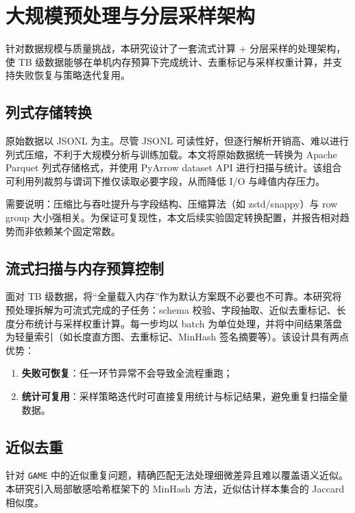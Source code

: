 \documentclass[UTF8]{article}
\begin{document}
\section{大规模预处理与分层采样架构}\label{sec:pipeline}

针对数据规模与质量挑战，本研究设计了一套流式计算 + 分层采样的处理架构，使 TB 级数据能够在单机内存预算下完成统计、去重标记与采样权重计算，并支持失败恢复与策略迭代复用。

\subsection{列式存储转换}\label{sec:parquet}

原始数据以 JSONL 为主。尽管 JSONL 可读性好，但逐行解析开销高、难以进行列式压缩，不利于大规模分析与训练加载。本文将原始数据统一转换为 Apache Parquet 列式存储格式，并使用 PyArrow dataset API 进行扫描与统计。该组合可利用列裁剪与谓词下推仅读取必要字段，从而降低 I/O 与峰值内存压力。\citep{arrow2016apache}

需要说明：压缩比与吞吐提升与字段结构、压缩算法（如 zstd/snappy）与 row group 大小强相关。为保证可复现性，本文后续实验固定转换配置，并报告相对趋势而非依赖某个固定常数。

\subsection{流式扫描与内存预算控制}\label{sec:streaming}

面对 TB 级数据，将“全量载入内存”作为默认方案既不必要也不可靠。本研究将预处理拆解为可流式完成的子任务：schema 校验、字段抽取、近似去重标记、长度分布统计与采样权重计算。每一步均以 batch 为单位处理，并将中间结果落盘为轻量索引（如长度直方图、去重标记、MinHash 签名摘要等）。该设计具有两点优势：
\begin{enumerate}
    \item \textbf{失败可恢复}：任一环节异常不会导致全流程重跑；
    \item \textbf{统计可复用}：采样策略迭代时可直接复用统计与标记结果，避免重复扫描全量数据。
\end{enumerate}

\subsection{近似去重}\label{sec:minhash}

针对 \texttt{GAME} 中的近似重复问题，精确匹配无法处理细微差异且难以覆盖语义近似。本研究引入局部敏感哈希框架下的 MinHash 方法，近似估计样本集合的 Jaccard 相似度。\citep{broder1997resemblance}
\end{document}
